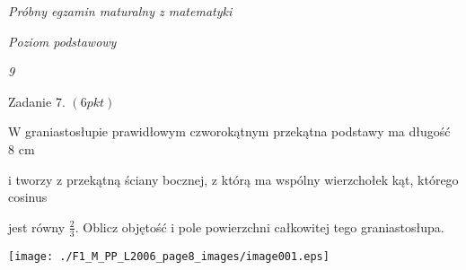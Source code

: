\documentclass[a4paper,12pt]{article}
\begin{document}
{\it Próbny egzamin maturalny z matematyki}

{\it Poziom podstawowy}

{\it 9}

Zadanie 7. $(6pkt)$

$\mathrm{W}$ graniastosłupie prawidłowym czworokątnym przekątna podstawy ma długość 8 cm

i tworzy z przekątną ściany bocznej, z którą ma wspólny wierzchołek kąt, którego cosinus

jest równy $\displaystyle \frac{2}{3}$. Oblicz objętość i pole powierzchni całkowitej tego graniastosłupa.
\begin{center}
\texttt{[image: ./F1\_M\_PP\_L2006\_page8\_images/image001.eps]}
\end{center}
\end{document}
